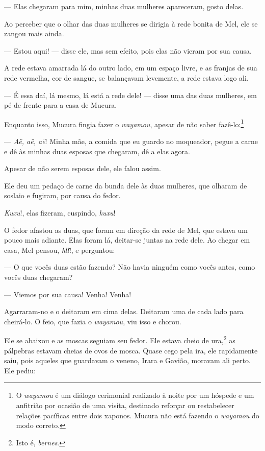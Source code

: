 --- Elas chegaram para mim, minhas duas mulheres apareceram, gosto
delas. 

Ao perceber que o olhar das duas mulheres se dirigia à rede bonita de
Mel, ele se zangou mais ainda. 

--- Estou aqui! --- disse ele, mas sem efeito, pois elas não vieram por
sua causa.

A rede estava amarrada lá do outro lado, em um espaço livre, e as
franjas de sua rede vermelha, cor de sangue, se balançavam levemente, a
rede estava logo ali. 

--- É essa daí, lá mesmo, lá está a rede dele! --- disse uma das duas
mulheres, em pé de frente para a casa de Mucura. 

Enquanto isso, Mucura fingia fazer o \textit{wayamou}, apesar de não saber
fazê-lo:\footnote{O \textit{wayamou} é um diálogo cerimonial realizado à noite por um hóspede e um anfitrião por ocasião de uma visita, destinado reforçar ou restabelecer relações pacíficas entre dois xaponos. Mucura não está fazendo o \textit{wayamou} do modo correto.} 

--- \textit{Aë, aë, aë}! Minha mãe, a comida que eu guardo no moqueador,
pegue a carne e dê às minhas duas esposas que chegaram, dê a elas
agora. 

Apesar de não serem esposas dele, ele falou assim. 

Ele deu um pedaço de carne da bunda dele às duas mulheres, que olharam
de soslaio e fugiram, por causa do fedor. 

\textit{Kuxu}!, elas fizeram, cuspindo, \textit{kuxu}!

O fedor afastou as duas, que foram em direção da rede de Mel, que estava um pouco mais adiante. Elas foram lá, deitar-se juntas na rede
dele. Ao chegar em casa, Mel pensou, \textit{hɨ̃ɨ}!, e perguntou:

--- O que vocês duas estão fazendo? Não havia ninguém como vocês antes,
como vocês duas chegaram?

--- Viemos por sua causa! Venha! Venha! 

Agarraram-no e o deitaram em cima delas. Deitaram uma de cada lado para
cheirá-lo. O feio, que fazia o \textit{wayamou}, viu isso e
chorou. 

Ele se abaixou e as moscas seguiam seu fedor. Ele estava cheio de
ura,\footnote{Isto é, \textit{bernes}.} as pálpebras estavam cheias de ovos de mosca.
Quase cego pela ira, ele rapidamente saiu, pois aqueles que guardavam o
veneno, Irara e Gavião, moravam ali perto. Ele pediu: 

